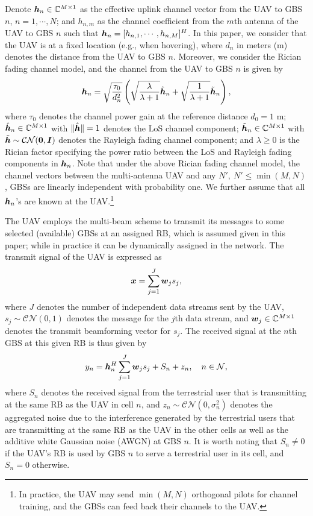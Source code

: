 \documentclass[onecolumn, draftclsnofoot, 12pt]{IEEEtran}
\newcommand{\mv}[1]{\mbox{\boldmath{$ #1 $}}}
\begin{document}
Denote $\mv{h}_n\in \mathbb{C}^{M\times 1}$ as the effective uplink channel vector from the UAV to GBS $n$, $n=1,\cdots,N$; and $h_{n,m}$ as the channel coefficient from the $m$th antenna of the UAV to GBS $n$ such that $\mv{h}_n=[h_{n,1},\cdots,h_{n,M}]^H$. In this paper, we consider that the UAV is at a fixed location (e.g., when hovering), where $d_n$ in meters (m) denotes the distance from the UAV to GBS $n$. Moreover, we consider the Rician fading channel model, and the channel from the UAV to GBS $n$ is given by
\begin{align}\label{eqn:Rician channel}
\mv{h}_n=\sqrt{\frac{\tau_0}{d_n^2}}\left(\sqrt{\frac{\lambda}{\lambda+1}}\hat{\mv{h}}_n+\sqrt{\frac{1}{\lambda+1}}\tilde{\mv{h}}_n\right),
\end{align}where $\tau_0$ denotes the channel power gain at the reference distance $d_0=1$ m; $\hat{\mv{h}}_n\in \mathbb{C}^{M\times 1}$ with $\|\hat{\mv{h}}\|=1$ denotes the LoS channel component; $\tilde{\mv{h}}_n\in \mathbb{C}^{M\times 1}$ with $\tilde{\mv{h}}\sim \mathcal{CN}(\mv{0},\mv{I})$ denotes the Rayleigh fading channel component; and $\lambda\geq 0$ is the Rician factor specifying the power ratio between the LoS and Rayleigh fading components in $\mv{h}_n$. Note that under the above Rician fading channel model, the channel vectors between the multi-antenna UAV and any $N',\ N'\leq \min(M,N)$, GBSs are linearly independent with probability one. We further assume that all ${\mv{h}}_n$'s are known at the UAV.\footnote{In practice, the UAV may send $\min(M,N)$ orthogonal pilots for channel training, and the GBSs can feed back their channels to the UAV.}

The UAV employs the multi-beam scheme to transmit its messages to some selected (available) GBSs at an assigned RB, which is assumed given in this paper; while in practice it can be dynamically assigned in the network. The transmit signal of the UAV is expressed as
\begin{equation}\label{eqn:transmit signal}
\mv{x}=\sum\limits_{j=1}^J\mv{w}_js_j,
\end{equation}
where $J$ denotes the number of independent data streams sent by the UAV, $s_j\sim \mathcal{CN}(0,1)$ denotes the message for the $j$th data stream, and $\mv{w}_j\in \mathbb{C}^{M\times 1}$ denotes the transmit beamforming vector for $s_j$. The received signal at the $n$th GBS at this given RB is thus given by
\begin{equation}\label{eqn:received signal GBS}
y_{n}=\mv{h}_{n}^H\sum\limits_{j=1}^J\mv{w}_js_j+S_n+z_{n}, ~~~ n\in \mathcal{N},
\end{equation}
where $S_n$ denotes the received signal from the terrestrial user that is transmitting at the same RB as the UAV in cell $n$, and $z_n\sim \mathcal{CN}(0,\sigma_n^2)$ denotes the aggregated noise due to the interference generated by the terrestrial users that are transmitting at the same RB as the UAV in the other cells as well as the additive white Gaussian noise (AWGN) at GBS $n$. It is worth noting that $S_n\neq 0$ if the UAV's RB is used by GBS $n$ to serve a terrestrial user in its cell, and $S_n=0$ otherwise.
\end{document}
